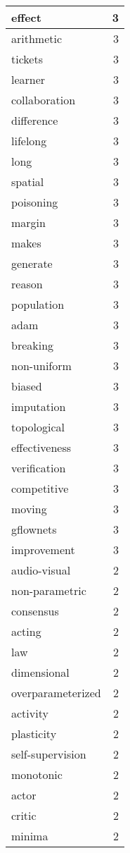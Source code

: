 \begin{table}[h]
\begin{tabular}{|l|r|}
\hline
effect & 3 \\
\hline
arithmetic & 3 \\
\hline
tickets & 3 \\
\hline
learner & 3 \\
\hline
collaboration & 3 \\
\hline
difference & 3 \\
\hline
lifelong & 3 \\
\hline
long & 3 \\
\hline
spatial & 3 \\
\hline
poisoning & 3 \\
\hline
margin & 3 \\
\hline
makes & 3 \\
\hline
generate & 3 \\
\hline
reason & 3 \\
\hline
population & 3 \\
\hline
adam & 3 \\
\hline
breaking & 3 \\
\hline
non-uniform & 3 \\
\hline
biased & 3 \\
\hline
imputation & 3 \\
\hline
topological & 3 \\
\hline
effectiveness & 3 \\
\hline
verification & 3 \\
\hline
competitive & 3 \\
\hline
moving & 3 \\
\hline
gflownets & 3 \\
\hline
improvement & 3 \\
\hline
audio-visual & 2 \\
\hline
non-parametric & 2 \\
\hline
consensus & 2 \\
\hline
acting & 2 \\
\hline
law & 2 \\
\hline
dimensional & 2 \\
\hline
overparameterized & 2 \\
\hline
activity & 2 \\
\hline
plasticity & 2 \\
\hline
self-supervision & 2 \\
\hline
monotonic & 2 \\
\hline
actor & 2 \\
\hline
critic & 2 \\
\hline
minima & 2 \\

\end{tabular}
\end{table}
